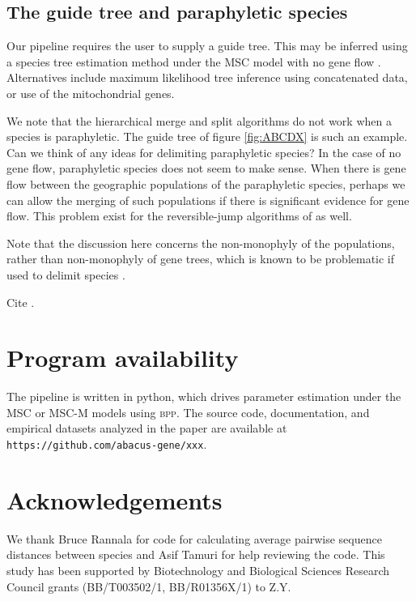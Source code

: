 \documentclass{article1}
\begin{document}
\subsection{The guide tree and paraphyletic species}

Our pipeline requires the user to supply a guide tree.  This may be inferred using a
species tree estimation method under the MSC model with no gene flow \citep{Yang2014,
Rannala2017}.  Alternatives include maximum likelihood tree inference using concatenated
data, or use of the mitochondrial genes.

We note that the hierarchical merge and split algorithms do not work when a species is
paraphyletic.  The guide tree of figure \ref{fig:ABCDX} is such an example.  Can we
think of any ideas for delimiting paraphyletic species?  In the case of no gene flow,
paraphyletic species does not seem to make sense.  When there is gene flow between the
geographic populations of the paraphyletic species, perhaps we can allow the merging of
such populations if there is significant evidence for gene flow.  This problem exist for
the reversible-jump algorithms of \citet{Yang2010} as well.

Note that the discussion here concerns the non-monophyly of the populations, rather than
non-monophyly of gene trees, which is known to be problematic if used to delimit species
\cite{Knowles2007}.

Cite \citet{Sukumaran2021, Solis-Lemus2015}.  


\section{Program availability}

The pipeline is written in python, which drives parameter estimation under the MSC or
MSC-M models using \textsc{bpp}.  The source code, documentation, and empirical datasets
analyzed in the paper are available at \texttt{\small https://github.com/abacus-gene/xxx}.

\section{Acknowledgements} 

We thank Bruce Rannala for code for calculating average pairwise sequence distances
between species and Asif Tamuri for help reviewing the code.  This study has been
supported by Biotechnology and Biological Sciences Research Council grants (BB/T003502/1,
BB/R01356X/1) to Z.Y.
\end{document}
